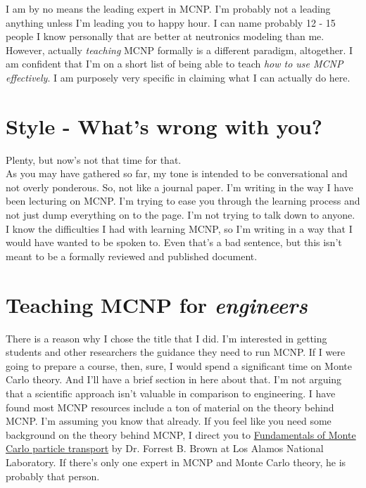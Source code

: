 \documentclass[11pt,a4paper]{article}
\begin{document}
\noindent I am by no means the leading expert in MCNP. I'm probably not a leading anything unless I'm leading you to happy hour. I can name probably 12 - 15 people I know personally that are better at neutronics modeling than me. However, actually \textit{teaching} MCNP formally is a different paradigm, altogether. I am confident that I'm on a short list of being able to teach \textit{how to use MCNP effectively}. I am purposely very specific in claiming what I can actually do here.

\section{Style - What's wrong with you?}
\noindent Plenty, but now's not that time for that. \\

\noindent As you may have gathered so far, my tone is intended to be conversational and not overly ponderous. So, not like a journal paper. I'm writing in the way I have been lecturing on MCNP. I'm trying to ease you through the learning process and not just dump everything on to the page. I'm not trying to talk down to anyone. I know the difficulties I had with learning MCNP, so I'm writing in a way that I would have wanted to be spoken to. Even that's a bad sentence, but this isn't meant to be a formally reviewed and published document.\\

\newpage


\section{Teaching MCNP for \textit{engineers}}
\noindent There is a reason why I chose the title that I did. I'm interested in getting students and other researchers the guidance they need to run MCNP. If I were going to prepare a course, then, sure, I would spend a significant time on Monte Carlo theory. And I'll have a brief section in here about that. I'm not arguing that a scientific approach isn't valuable in comparison to engineering. I have found most MCNP resources include a ton of material on the theory behind MCNP. I'm assuming you know that already. If you feel like you need some background on the theory behind MCNP, I direct you to \href{https://laws.lanl.gov/vhosts/mcnp.lanl.gov/pdf_files/la-ur-05-4983.pdf}{Fundamentals of Monte Carlo particle transport} by Dr. Forrest B. Brown at Los Alamos National Laboratory. If there's only one expert in MCNP and Monte Carlo theory, he is probably that person. 
\end{document}
